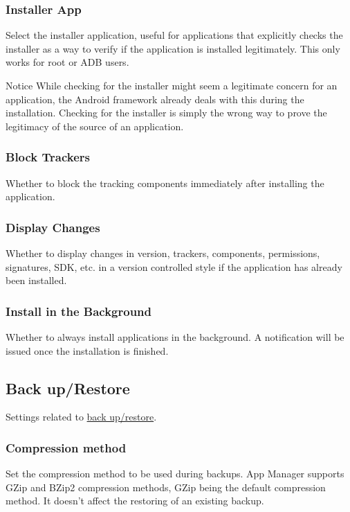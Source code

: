 \subsubsection{Installer App} %
Select the installer application, useful for applications that explicitly checks the installer as a way to verify if the application is installed legitimately.
This only works for root or ADB users.

\begin{tip}{Notice}
    While checking for the installer might seem a legitimate concern for an application, the Android framework already deals with this during the installation.
    Checking for the installer is simply the wrong way to prove the legitimacy of the source of an application.
\end{tip}

\subsubsection{Block Trackers} %
Whether to block the tracking components immediately after installing the application.

\subsubsection{Display Changes} %
Whether to display changes in version, trackers, components, permissions, signatures, SDK, etc. in a version controlled style if the application has already been installed.

\subsubsection{Install in the Background} %
Whether to always install applications in the background. A notification will be issued once the installation is finished.

\subsection{Back up/Restore}\label{subsec:backup/restore} %
Settings related to \hyperref[sec:backup-restore]{back up/restore}.

\subsubsection{Compression method} %
Set the compression method to be used during backups. App Manager supports GZip and BZip2 compression methods,
GZip being the default compression method. It doesn't affect the restoring of an existing backup.

